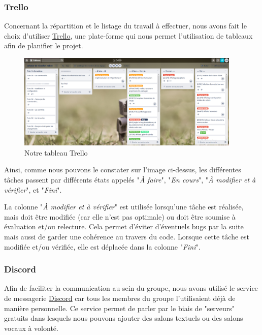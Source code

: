 \documentclass[a4paper, 12pt]{article}
\begin{document}
		\subsubsection{Trello}

			Concernant la répartition et le listage du travail à effectuer, nous avons fait le choix d'utiliser \href{https://trello.com/}{Trello}, une plate-forme qui nous permet l'utilisation de tableaux afin de planifier le projet.

			\begin{figure}[H]
				\centering\includegraphics[width=0.95\textwidth]{images/trello.png}
				\caption{Notre tableau Trello}
			\end{figure}

			Ainsi, comme nous pouvons le constater sur l'image ci-dessus, les différentes tâches passent par différents états appelés "\textit{À faire}", "\textit{En cours}", "\textit{À modifier et à vérifier}", et "\textit{Fini}".

			La colonne "\textit{À modifier et à vérifier}" est utilisée lorsqu'une tâche est réalisée, mais doit être modifiée (car elle n'est pas optimale) ou doit être soumise à évaluation et/ou relecture. Cela permet d'éviter d'éventuels bugs par la suite mais aussi de garder une cohérence au travers du code. Lorsque cette tâche est modifiée et/ou vérifiée, elle est déplacée dans la colonne "\textit{Fini}".

		\subsubsection{Discord}

			Afin de faciliter la communication au sein du groupe, nous avons utilisé le service de messagerie \href{https://discordapp.com/}{Discord}  car tous les membres du groupe l'utilisaient déjà de manière personnelle. Ce service permet de parler par le biais de "serveurs" gratuits dans lesquels nous pouvons ajouter des salons textuels ou des salons vocaux à volonté.
\end{document}

